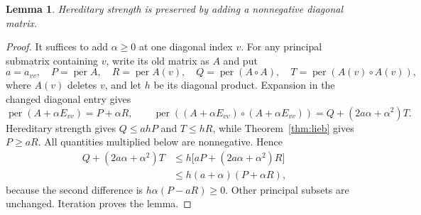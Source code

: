 \documentclass[11pt]{article}
\newtheorem{lemma}[theorem]{Lemma}
\theoremstyle{remark}\newtheorem{remark}[theorem]{Remark}
\DeclareMathOperator{\per}{per}
\begin{document}
\begin{lemma}\label{lem:diagonal}
Hereditary strength is preserved by adding a nonnegative diagonal matrix.
\end{lemma}
\begin{proof}
It suffices to add $\alpha\ge0$ at one diagonal index $v$. For any
principal submatrix containing $v$, write its old matrix as $A$ and put
\[
a=a_{vv},\quad P=\per A,\quad R=\per A(v),\quad
Q=\per(A\circ A),\quad T=\per(A(v)\circ A(v)),
\]
where $A(v)$ deletes $v$, and let $h$ be its diagonal product.
Expansion in the changed diagonal entry gives
\[
\per(A+\alpha E_{vv})=P+\alpha R,\qquad
\per((A+\alpha E_{vv})\circ(A+\alpha E_{vv}))
=Q+(2a\alpha+\alpha^2)T.
\]
Hereditary strength gives $Q\le ahP$ and $T\le hR$, while
Theorem~\ref{thm:lieb} gives $P\ge aR$. All quantities multiplied
below are nonnegative. Hence
\begin{align*}
Q+(2a\alpha+\alpha^2)T
&\le h\bigl[aP+(2a\alpha+\alpha^2)R\bigr]\\
&\le h(a+\alpha)(P+\alpha R),
\end{align*}
because the second difference is $h\alpha(P-aR)\ge0$.
Other principal subsets are unchanged. Iteration proves the lemma.
\end{proof}
\end{document}
